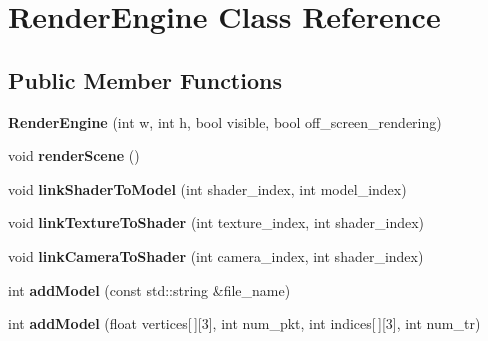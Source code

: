 \hypertarget{classRenderEngine}{\section{Render\-Engine Class Reference}
\label{classRenderEngine}
}
\subsection*{Public Member Functions}
\begin{DoxyCompactItemize}
\item 
\hypertarget{classRenderEngine_a19c1c07a684f30ef9da1ee5ead43d0a9}{{\bfseries Render\-Engine} (int w, int h, bool visible, bool off\-\_\-screen\-\_\-rendering)}\label{classRenderEngine_a19c1c07a684f30ef9da1ee5ead43d0a9}

\item 
\hypertarget{classRenderEngine_a371ddf7250473c2278244c68c63118ef}{void {\bfseries render\-Scene} ()}\label{classRenderEngine_a371ddf7250473c2278244c68c63118ef}

\item 
\hypertarget{classRenderEngine_afdd3f4c46666621d615b9c99c65b5bd5}{void {\bfseries link\-Shader\-To\-Model} (int shader\-\_\-index, int model\-\_\-index)}\label{classRenderEngine_afdd3f4c46666621d615b9c99c65b5bd5}

\item 
\hypertarget{classRenderEngine_afb62db8fbcc33d19b4637c00c7d54e55}{void {\bfseries link\-Texture\-To\-Shader} (int texture\-\_\-index, int shader\-\_\-index)}\label{classRenderEngine_afb62db8fbcc33d19b4637c00c7d54e55}

\item 
\hypertarget{classRenderEngine_a71f77fbbe122fbceb3b8d47d46989ead}{void {\bfseries link\-Camera\-To\-Shader} (int camera\-\_\-index, int shader\-\_\-index)}\label{classRenderEngine_a71f77fbbe122fbceb3b8d47d46989ead}

\item 
\hypertarget{classRenderEngine_a30f7fba93bd96f1b81ddb4635961f1b5}{int {\bfseries add\-Model} (const std\-::string \&file\-\_\-name)}\label{classRenderEngine_a30f7fba93bd96f1b81ddb4635961f1b5}

\item 
\hypertarget{classRenderEngine_aca813fc515704267c0a01914d8053622}{int {\bfseries add\-Model} (float vertices\mbox{[}$\,$\mbox{]}\mbox{[}3\mbox{]}, int num\-\_\-pkt, int indices\mbox{[}$\,$\mbox{]}\mbox{[}3\mbox{]}, int num\-\_\-tr)}\label{classRenderEngine_aca813fc515704267c0a01914d8053622}


\end{DoxyCompactItemize}
